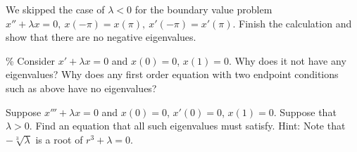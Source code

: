 \documentclass{ximera}
\begin{document}
\begin{exercise}
    We skipped the case of $\lambda < 0$ for the boundary value problem $x'' + \lambda x = 0, ~ x(-\pi) = x(\pi), ~ x'(-\pi) = x'(\pi)$. Finish the calculation and show that there are no negative eigenvalues.
\end{exercise}

\begin{exercise}\%
    Consider $x' + \lambda x = 0$ and $x(0)=0$, $x(1) = 0$.  Why does it not have any eigenvalues?  Why does any first order equation with two endpoint conditions such as above have no eigenvalues?
\end{exercise}

\begin{exercise}%
    Suppose $x''' + \lambda x = 0$ and $x(0)=0$, $x'(0) = 0$, $x(1) = 0$. Suppose that $\lambda > 0$.  Find an equation that all such eigenvalues must satisfy. Hint: Note that $-\sqrt[3]{\lambda}$ is a root of $r^3+\lambda = 0$.
\end{exercise}


\end{document}
